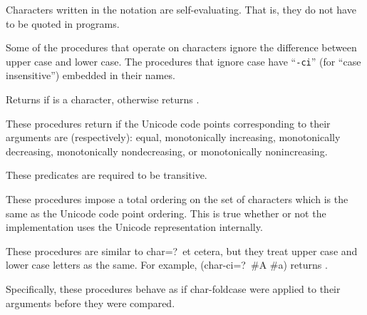 Characters written in the \sharpsign\backwhack{} notation are self-evaluating.
That is, they do not have to be quoted in programs.  

\vest Some of the procedures that operate on characters ignore the
difference between upper case and lower case.  The procedures that
ignore case have \hbox{``{\tt -ci}''} (for ``case
insensitive'') embedded in their names.


\begin{entry}{%
}

Returns \schtrue{} if  is a character, otherwise returns \schfalse.

\end{entry}


\begin{entry}{%
}

\label{characterequality}

These procedures return \schtrue{} if the Unicode code points corresponding to their arguments are (respectively):
equal, monotonically increasing, monotonically decreasing,
monotonically nondecreasing, or monotonically nonincreasing.

These predicates are required to be transitive.

These procedures impose a total ordering on the set of characters which
is the same as the Unicode code point ordering.  This is true 
whether or not the implementation uses the Unicode representation internally.

\end{entry}


\begin{entry}{%
}

These procedures are similar to {\cf char=?}\ et cetera, but they treat
upper case and lower case letters as the same.  For example, {\cf
(char-ci=?\ \#\backwhack{}A \#\backwhack{}a)} returns \schtrue.

Specifically, these procedures behave as if {\cf char-foldcase} were
applied to their arguments before they were compared.

\end{entry}


